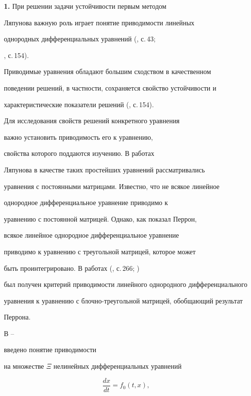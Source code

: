 {\bf 1.} При решении задачи устойчивости первым методом


Ляпунова важную роль играет понятие приводимости линейных


однородных дифференциальных уравнений (\cite{LyapOb}, с.\,43; 


\cite{DemLe}, с.\,154).


Приводимые уравнения обладают большим сходством в качественном


поведении решений, в частности, сохраняется свойство устойчивости и


характеристические показатели решений (\cite{DemLe}, с.\,154).


Для исследования свойств решений конкретного уравнения


важно установить приводимость его к уравнению,


свойства которого поддаются изучению. В работах


Ляпунова в качестве таких простейших уравнений рассматривались


уравнения с постоянными матрицами. Известно, что не всякое линейное


однородное дифференциальное уравнение приводимо к


уравнению с постоянной матрицей. Однако, как показал Перрон,


всякое линейное однородное дифференциальное уравнение


приводимо к уравнению с треугольной матрицей, которое может


быть проинтегрировано. В работах (\cite{BilTe}, с.\,266; \cite{BilOb})


был получен критерий приводимости линейного однородного дифференциального 


уравнения к уравнению с блочно-треугольной матрицей, обобщающий результат


Перрона.





В \cite{VoskrGr}--\cite{VoskrOp} 


введено понятие приводимости


на множестве $\Xi$ нелинейных дифференциальных уравнений


\begin{equation}


\label{1}


\frac{dx}{dt}=f_{0}(t,x),


\end{equation}


